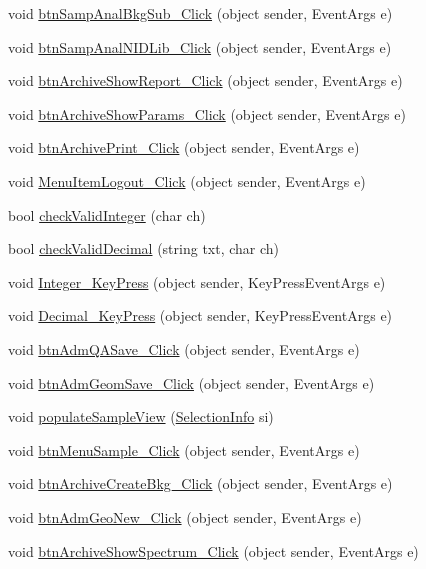 \begin{DoxyCompactItemize}
void \hyperlink{class_scintilab_1_1_form_main_a7cef2942c91ce3e6d209aec5e17f8751}{btn\+Samp\+Anal\+Bkg\+Sub\+\_\+\+Click} (object sender, Event\+Args e)
\item 
void \hyperlink{class_scintilab_1_1_form_main_aa1b4a5be131daa0da4742d5011088756}{btn\+Samp\+Anal\+N\+I\+D\+Lib\+\_\+\+Click} (object sender, Event\+Args e)
\item 
void \hyperlink{class_scintilab_1_1_form_main_a5a12d967594f000e71f7f8e79eded8d4}{btn\+Archive\+Show\+Report\+\_\+\+Click} (object sender, Event\+Args e)
\item 
void \hyperlink{class_scintilab_1_1_form_main_a732f051d849b79cd620a0f699d3dcaeb}{btn\+Archive\+Show\+Params\+\_\+\+Click} (object sender, Event\+Args e)
\item 
void \hyperlink{class_scintilab_1_1_form_main_a73fdda90a8617b61e3de31be6b659564}{btn\+Archive\+Print\+\_\+\+Click} (object sender, Event\+Args e)
\item 
void \hyperlink{class_scintilab_1_1_form_main_a6d7ebeb5c9dadf53b29f7faccdad6102}{Menu\+Item\+Logout\+\_\+\+Click} (object sender, Event\+Args e)
\item 
bool \hyperlink{class_scintilab_1_1_form_main_a6cb8b069c0d1b488dbf0abef2b8fcfb3}{check\+Valid\+Integer} (char ch)
\item 
bool \hyperlink{class_scintilab_1_1_form_main_ac7955a16efd0a7b15614c904db1c4d20}{check\+Valid\+Decimal} (string txt, char ch)
\item 
void \hyperlink{class_scintilab_1_1_form_main_ae3cd051584a2767807a47d1d45a13d4e}{Integer\+\_\+\+Key\+Press} (object sender, Key\+Press\+Event\+Args e)
\item 
void \hyperlink{class_scintilab_1_1_form_main_a8b2aed106bf6da84eade77654137b723}{Decimal\+\_\+\+Key\+Press} (object sender, Key\+Press\+Event\+Args e)
\item 
void \hyperlink{class_scintilab_1_1_form_main_a6b4990d68fbc5c9c543e4403f5630229}{btn\+Adm\+Q\+A\+Save\+\_\+\+Click} (object sender, Event\+Args e)
\item 
void \hyperlink{class_scintilab_1_1_form_main_a52f26a9255f72e013f3b2067905838ca}{btn\+Adm\+Geom\+Save\+\_\+\+Click} (object sender, Event\+Args e)
\item 
void \hyperlink{class_scintilab_1_1_form_main_a5aefdcf34c90024ca153c8b8f1200c01}{populate\+Sample\+View} (\hyperlink{class_scintilab_1_1_selection_info}{Selection\+Info} si)
\item 
void \hyperlink{class_scintilab_1_1_form_main_a73ffa9e06d5936a593bf11d78f6abbc0}{btn\+Menu\+Sample\+\_\+\+Click} (object sender, Event\+Args e)
\item 
void \hyperlink{class_scintilab_1_1_form_main_a909462e7826215219d895954dec393c3}{btn\+Archive\+Create\+Bkg\+\_\+\+Click} (object sender, Event\+Args e)
\item 
void \hyperlink{class_scintilab_1_1_form_main_a91cb583dc09f198b098c9d99647053e1}{btn\+Adm\+Geo\+New\+\_\+\+Click} (object sender, Event\+Args e)
\item 
void \hyperlink{class_scintilab_1_1_form_main_a477fe2e53536fb7a63e77656fb196cd4}{btn\+Archive\+Show\+Spectrum\+\_\+\+Click} (object sender, Event\+Args e)
\end{DoxyCompactItemize}

